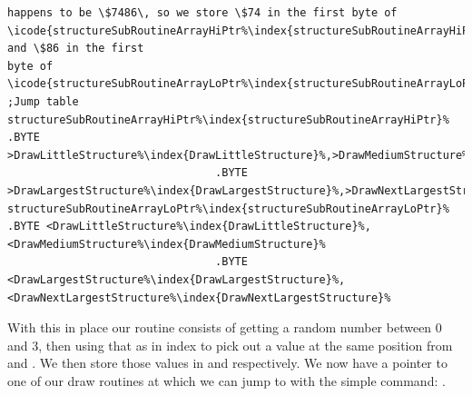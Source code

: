 \begin{lstlisting}[escapechar=\%,caption=A 'jump table' containing the addresses to our draw routines. The address for \icode{DrawLittleStructure\index{DrawLittleStructure}[escapechar=\%]}[escapechar=\%] 
happens to be \$7486\, so we store \$74 in the first byte of \icode{structureSubRoutineArrayHiPtr%\index{structureSubRoutineArrayHiPtr}%} and \$86 in the first
byte of \icode{structureSubRoutineArrayLoPtr%\index{structureSubRoutineArrayLoPtr}%}.,basicstyle=\tiny]
;Jump table
structureSubRoutineArrayHiPtr%\index{structureSubRoutineArrayHiPtr}%   .BYTE >DrawLittleStructure%\index{DrawLittleStructure}%,>DrawMediumStructure%\index{DrawMediumStructure}%
                                .BYTE >DrawLargestStructure%\index{DrawLargestStructure}%,>DrawNextLargestStructure%\index{DrawNextLargestStructure}%
structureSubRoutineArrayLoPtr%\index{structureSubRoutineArrayLoPtr}%   .BYTE <DrawLittleStructure%\index{DrawLittleStructure}%,<DrawMediumStructure%\index{DrawMediumStructure}%
                                .BYTE <DrawLargestStructure%\index{DrawLargestStructure}%,<DrawNextLargestStructure%\index{DrawNextLargestStructure}%
\end{lstlisting}

With this in place our routine consists of getting a random number between 0 and 3, then using that as in index to pick
out a value at the same position from  and .
We then store those values in  and  respectively. We now
have a pointer to one of our draw routines at  which we can jump to with the simple
command: . 



